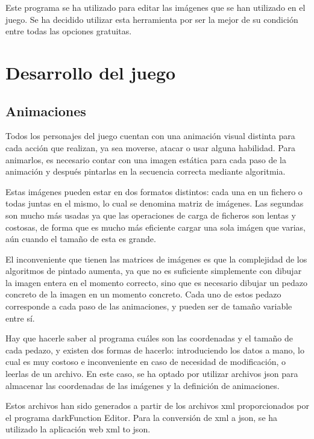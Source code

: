		Este programa se ha utilizado para editar las imágenes que se han utilizado en el juego. Se ha decidido utilizar esta herramienta por ser la mejor de su condición entre todas las opciones gratuitas.

\section{Desarrollo del juego}

	\subsection{Animaciones}

		Todos los personajes del juego cuentan con una animación visual distinta para cada acción que realizan, ya sea moverse, atacar o usar alguna habilidad. Para animarlos, es necesario contar con una imagen estática para cada paso de la animación y después pintarlas en la secuencia correcta mediante algoritmia.

		Estas imágenes pueden estar en dos formatos distintos: cada una en un fichero o todas juntas en el mismo, lo cual se denomina matriz de imágenes. Las segundas son mucho más usadas ya que las operaciones de carga de ficheros son lentas y costosas, de forma que es mucho más eficiente cargar una sola imágen que varias, aún cuando el tamaño de esta es grande.

		El inconveniente que tienen las matrices de imágenes es que la complejidad de los algoritmos de pintado aumenta, ya que no es suficiente simplemente con dibujar la imagen entera en el momento correcto, sino que es necesario dibujar un pedazo concreto de la imagen en un momento concreto. Cada uno de estos pedazo corresponde a cada paso de las animaciones, y pueden ser de tamaño variable entre sí.

		Hay que hacerle saber al programa cuáles son las coordenadas y el tamaño de cada pedazo, y existen dos formas de hacerlo: introduciendo los datos a mano, lo cual es muy costoso e inconveniente en caso de necesidad de modificación, o leerlas de un archivo. En este caso, se ha optado por utilizar archivos \acrshort{json} para almacenar las coordenadas de las imágenes y la definición de animaciones.

		Estos archivos han sido generados a partir de los archivos \acrshort{xml} proporcionados por el programa darkFunction Editor. Para la conversión de \acrshort{xml} a \acrshort{json}, se ha utilizado la aplicación web \acrshort{xml} to \acrshort{json}.


